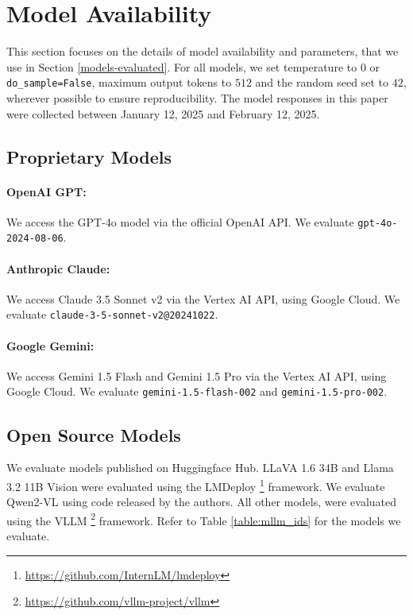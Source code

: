 \section{Model Availability} \label{appendix-availability}

This section focuses on the details of model availability and parameters, that we use in Section \ref{models-evaluated}. For all models, we set temperature to $0$ or \texttt{do\_sample=False}, maximum output tokens to $512$ and the random seed set to $42$, wherever possible to ensure reproducibility. The model responses in this paper were collected between January 12, 2025 and February 12, 2025.

\subsection{Proprietary Models}

\paragraph{OpenAI GPT:} We access the GPT-4o model via the official OpenAI API. We evaluate \texttt{gpt-4o-2024-08-06}.

\paragraph{Anthropic Claude:} We access Claude 3.5 Sonnet v2 via the Vertex AI API, using Google Cloud. We evaluate \texttt{claude-3-5-sonnet-v2@20241022}.

\paragraph{Google Gemini:} We access Gemini 1.5 Flash and Gemini 1.5 Pro via the Vertex AI API, using Google Cloud. We evaluate \texttt{gemini-1.5-flash-002} and \texttt{gemini-1.5-pro-002}. 

\subsection{Open Source Models}
We evaluate models published on Huggingface Hub. LLaVA 1.6 34B and Llama 3.2 11B Vision were evaluated using the LMDeploy \footnote{\url{https://github.com/InternLM/lmdeploy}} framework. We evaluate Qwen2-VL using code released by the authors. All other models, were evaluated using the VLLM \footnote{\url{https://github.com/vllm-project/vllm}} framework. Refer to Table \ref{table:mllm_ids} for the models we evaluate.

